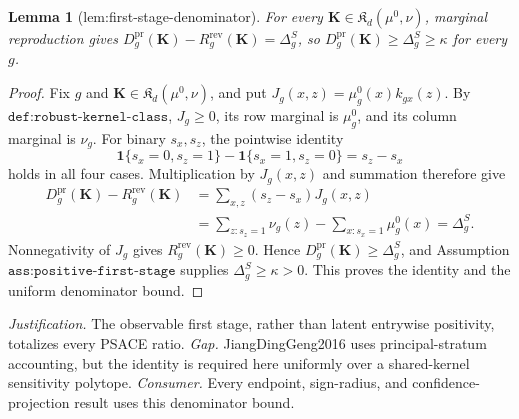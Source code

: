 \documentclass{article}
\newtheorem{lemma}{Lemma}
\begin{document}
\begin{lemma}[lem:first-stage-denominator]\label{lem:first-stage-denominator}
For every \(\mathbf K\in\mathfrak K_d(\mu^0,\nu)\), marginal reproduction gives \(D_g^{\mathrm{pr}}(\mathbf K)-R_g^{\mathrm{rev}}(\mathbf K)=\Delta_g^S\), so \(D_g^{\mathrm{pr}}(\mathbf K)\ge\Delta_g^S\ge\kappa\) for every \(g\).
\end{lemma}
\begin{proof}
Fix \(g\) and \(\mathbf K\in\mathfrak K_d(\mu^0,\nu)\), and put
\(J_g(x,z)=\mu_g^0(x)k_{gx}(z)\).  By \(\texttt{def:robust-kernel-class}\), \(J_g\ge0\), its row marginal is \(\mu_g^0\), and its column marginal is \(\nu_g\).  For binary \(s_x,s_z\), the pointwise identity
\[
 \mathbf 1\{s_x=0,s_z=1\}-\mathbf 1\{s_x=1,s_z=0\}
 =s_z-s_x
\]
holds in all four cases.  Multiplication by \(J_g(x,z)\) and summation therefore give
\[
\begin{aligned}
 D_g^{\mathrm{pr}}(\mathbf K)-R_g^{\mathrm{rev}}(\mathbf K)
 &=\sum_{x,z}(s_z-s_x)J_g(x,z)\\
 &=\sum_{z:s_z=1}\nu_g(z)-\sum_{x:s_x=1}\mu_g^0(x)
 =\Delta_g^S.
\end{aligned}
\]
Nonnegativity of \(J_g\) gives \(R_g^{\mathrm{rev}}(\mathbf K)\ge0\).  Hence
\(D_g^{\mathrm{pr}}(\mathbf K)\ge\Delta_g^S\), and Assumption \(\texttt{ass:positive-first-stage}\) supplies \(\Delta_g^S\ge\kappa>0\).  This proves the identity and the uniform denominator bound.
\end{proof}
\par\smallskip\noindent \textit{Justification.} The observable first stage, rather than latent entrywise positivity, totalizes every PSACE ratio. \textit{Gap.} JiangDingGeng2016 uses principal-stratum accounting, but the identity is required here uniformly over a shared-kernel sensitivity polytope. \textit{Consumer.} Every endpoint, sign-radius, and confidence-projection result uses this denominator bound.
\end{document}
